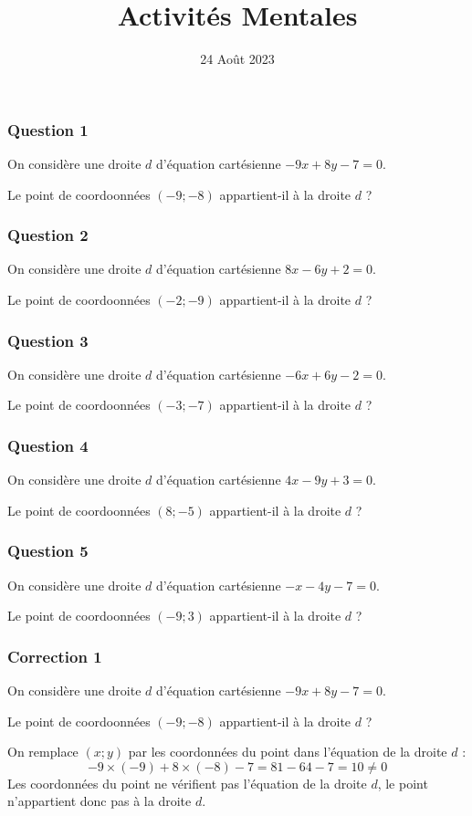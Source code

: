 \documentclass[15pt, mathserif]{beamer}
\title{Activités Mentales}
\date{24 Août 2023}
\begin{document}
\begin{frame}
    \titlepage
\end{frame}

\begin{frame} 
	\frametitle{Question 1}
On considère une droite $d$ d'équation cartésienne $-9x+8y-7=0$. 
 
 Le point de coordoonnées $(-9;-8)$ appartient-il à la droite $d$ ?\end{frame}


\begin{frame} 
	\frametitle{Question 2}
On considère une droite $d$ d'équation cartésienne $8x-6y+2=0$. 
 
 Le point de coordoonnées $(-2;-9)$ appartient-il à la droite $d$ ?\end{frame}


\begin{frame} 
	\frametitle{Question 3}
On considère une droite $d$ d'équation cartésienne $-6x+6y-2=0$. 
 
 Le point de coordoonnées $(-3;-7)$ appartient-il à la droite $d$ ?\end{frame}


\begin{frame} 
	\frametitle{Question 4}
On considère une droite $d$ d'équation cartésienne $4x-9y+3=0$. 
 
 Le point de coordoonnées $(8;-5)$ appartient-il à la droite $d$ ?\end{frame}


\begin{frame} 
	\frametitle{Question 5}
On considère une droite $d$ d'équation cartésienne $-x-4y-7=0$. 
 
 Le point de coordoonnées $(-9;3)$ appartient-il à la droite $d$ ?\end{frame}


\begin{frame}
\vspace{-10mm}
	\frametitle{Correction 1}
On considère une droite $d$ d'équation cartésienne $-9x+8y-7=0$. 
 
 Le point de coordoonnées $(-9;-8)$ appartient-il à la droite $d$ ? 
 
  \bigskip 
 On remplace $(x; y)$ par les coordonnées du point dans l'équation de la droite $d$ : $$ -9\times \left(-9\right)+8\times\left(-8\right)-7= 81-64-7=10\neq 0 $$ 
 Les coordonnées du point ne vérifient pas l'équation de la droite $d$, le point n'appartient donc pas à la droite $d$.\end{frame}
\end{document}
